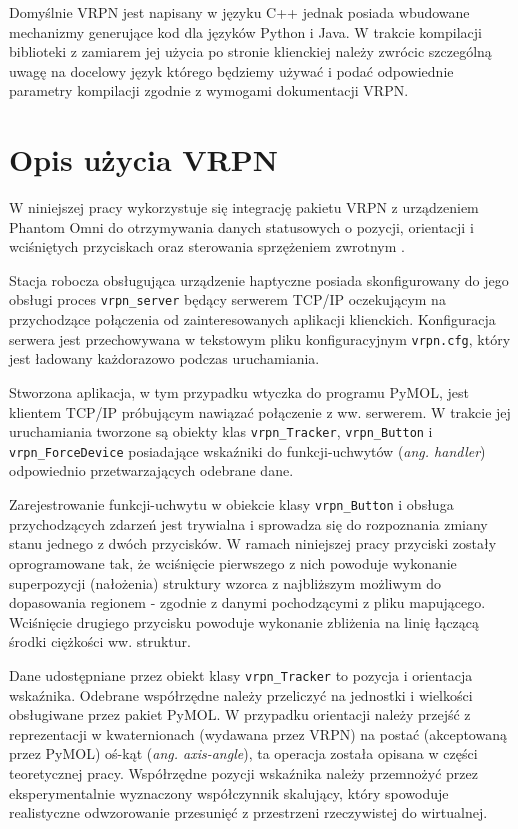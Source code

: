\documentclass[licencjacka]{pracamgr}
\begin{document}
Domyślnie VRPN jest napisany w języku C++ jednak posiada wbudowane mechanizmy generujące kod dla języków Python i Java. W trakcie kompilacji biblioteki z zamiarem jej użycia po stronie klienckiej należy zwrócic szczególną uwagę na docelowy język którego będziemy używać i podać odpowiednie parametry kompilacji zgodnie z wymogami dokumentacji VRPN. 

\section{Opis użycia VRPN}
W niniejszej pracy wykorzystuje się integrację pakietu VRPN z urządzeniem Phantom Omni do otrzymywania danych statusowych o pozycji, orientacji i wciśniętych przyciskach oraz sterowania sprzężeniem zwrotnym \cite{rodriguezGonzalez2015}.

Stacja robocza obsługująca urządzenie haptyczne posiada skonfigurowany do jego obsługi proces \texttt{vrpn\_server} będący serwerem TCP/IP oczekującym na przychodzące połączenia od zainteresowanych aplikacji klienckich. Konfiguracja serwera jest przechowywana w tekstowym pliku konfiguracyjnym \texttt{vrpn.cfg}, który jest ładowany każdorazowo podczas uruchamiania. 

Stworzona aplikacja, w tym przypadku wtyczka do programu PyMOL, jest klientem TCP/IP próbującym nawiązać połączenie z ww. serwerem. W trakcie jej uruchamiania tworzone są obiekty klas \texttt{vrpn\_Tracker}, \texttt{vrpn\_Button} i \texttt{vrpn\_ForceDevice} posiadające wskaźniki do funkcji-uchwytów (\textit{ang. handler}) odpowiednio przetwarzających odebrane dane.

Zarejestrowanie funkcji-uchwytu w obiekcie klasy \texttt{vrpn\_Button} i obsługa przychodzących zdarzeń jest trywialna i sprowadza się do rozpoznania zmiany stanu jednego z dwóch przycisków. W ramach niniejszej pracy przyciski zostały oprogramowane tak, że wciśnięcie pierwszego z nich powoduje wykonanie superpozycji (nałożenia) struktury wzorca z najbliższym możliwym do dopasowania regionem - zgodnie z danymi pochodzącymi z pliku mapującego. Wciśnięcie drugiego przycisku powoduje wykonanie zbliżenia na linię łączącą środki ciężkości ww. struktur.

Dane udostępniane przez obiekt klasy \texttt{vrpn\_Tracker} to pozycja i orientacja wskaźnika. Odebrane współrzędne należy przeliczyć na jednostki i wielkości obsługiwane przez pakiet PyMOL. W przypadku orientacji należy przejść z reprezentacji w kwaternionach (wydawana przez VRPN) na postać (akceptowaną przez PyMOL) oś-kąt (\textit{ang. axis-angle}), ta operacja została opisana w części teoretycznej pracy. Współrzędne pozycji wskaźnika należy przemnożyć przez eksperymentalnie wyznaczony współczynnik skalujący, który spowoduje realistyczne odwzorowanie przesunięć z przestrzeni rzeczywistej do wirtualnej.
\end{document}
